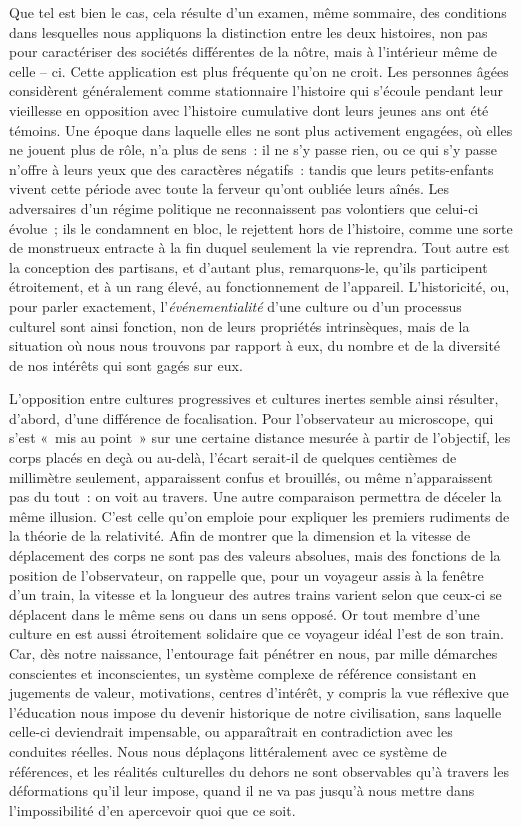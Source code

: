 \documentclass[french,twoside]{book} %
\begin{document}
Que tel est bien le cas, cela résulte d’un examen, même sommaire, des conditions dans lesquelles nous appliquons la distinction entre les deux histoires, non pas pour caractériser des sociétés différentes de la nôtre, mais à l’intérieur même de celle – ci. Cette application est plus fréquente qu’on ne croit. Les personnes âgées considèrent généralement comme stationnaire l’histoire qui s’écoule pendant leur vieillesse en opposition avec l’histoire cumulative dont leurs jeunes ans ont été témoins. Une époque dans laquelle elles ne sont plus activement engagées, où elles ne jouent plus de rôle, n’a plus de sens : il ne s’y passe rien, ou ce qui s’y passe n’offre à leurs yeux que des caractères négatifs : tandis que leurs petits-enfants vivent cette période avec toute la ferveur qu’ont oubliée leurs aînés. Les adversaires d’un régime politique ne reconnaissent pas volontiers que celui-ci évolue ; ils le condamnent en bloc, le rejettent hors de l’histoire, comme une sorte de monstrueux entracte à la fin duquel seulement la vie reprendra. Tout autre est la conception des partisans, et d’autant plus, remarquons-le, qu’ils participent étroitement, et à un rang élevé, au fonctionnement de l’appareil. L’historicité, ou, pour parler exactement, l’\emph{événementialité} d’une culture ou d’un processus culturel sont ainsi fonction, non de leurs propriétés intrinsèques, mais de la situation où nous nous trouvons par rapport à eux, du nombre et de la diversité de nos intérêts qui sont gagés sur eux.\par
L’opposition entre cultures progressives et cultures inertes semble ainsi résulter, d’abord, d’une différence de focalisation. Pour l’observateur au microscope, qui s’est « mis au point » sur une certaine distance mesurée à partir de l’objectif, les corps placés en deçà ou au-delà, l’écart serait-il de quelques centièmes de millimètre seulement, apparaissent confus et brouillés, ou même n’apparaissent pas du tout : on voit au travers. Une autre comparaison permettra de déceler la même illusion. C’est celle qu’on emploie pour expliquer les premiers rudiments de la théorie de la relativité. Afin de montrer que la dimension et la vitesse de déplacement des corps ne sont pas des valeurs absolues, mais des fonctions de la position de l’observateur, on rappelle que, pour un voyageur assis à la fenêtre d’un train, la vitesse et la longueur des autres trains varient selon que ceux-ci se déplacent dans le même sens ou dans un sens opposé. Or tout membre d’une culture en est aussi étroitement solidaire que ce voyageur idéal l’est de son train. Car, dès notre naissance, l’entourage fait pénétrer en nous, par mille démarches conscientes et inconscientes, un système complexe de référence consistant en jugements de valeur, motivations, centres d’intérêt, y compris la vue réflexive que l’éducation nous impose du devenir historique de notre civilisation, sans laquelle celle-ci deviendrait impensable, ou apparaîtrait en contradiction avec les conduites réelles. Nous nous déplaçons littéralement avec ce système de références, et les réalités culturelles du dehors ne sont observables qu’à travers les déformations qu’il leur impose, quand il ne va pas jusqu’à nous mettre dans l’impossibilité d’en apercevoir quoi que ce soit.\par
\end{document}
